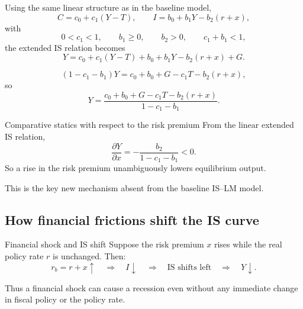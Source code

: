 Using the same linear structure as in the baseline model,
\[
C=c_0+c_1(Y-T),
\qquad
I=b_0+b_1Y-b_2(r+x),
\]
with
\[
0<c_1<1,\qquad b_1\ge 0,\qquad b_2>0,\qquad c_1+b_1<1,
\]
the extended IS relation becomes
\[
Y = c_0+c_1(Y-T)+b_0+b_1Y-b_2(r+x)+G.
\]

\begin{keyformula}[title={Key Formula: Linear extended IS relation}]
\[
(1-c_1-b_1)Y
=
c_0+b_0+G-c_1T-b_2(r+x),
\]
so
\[
Y
=
\frac{c_0+b_0+G-c_1T-b_2(r+x)}{1-c_1-b_1}.
\]
\end{keyformula}

\begin{theorem}{Comparative statics with respect to the risk premium}{}
From the linear extended IS relation,
\[
\frac{\partial Y}{\partial x}
=
-\frac{b_2}{1-c_1-b_1}
<0.
\]
So a rise in the risk premium unambiguously lowers equilibrium output.
\end{theorem}

\noindent
This is the key new mechanism absent from the baseline IS--LM model.

\subsection{How financial frictions shift the IS curve}

\begin{theorem}{Financial shock and IS shift}{}
Suppose the risk premium $x$ rises while the real policy rate $r$ is unchanged. Then:
\[
r_b = r+x \uparrow
\quad\Longrightarrow\quad
I \downarrow
\quad\Longrightarrow\quad
\text{IS shifts left}
\quad\Longrightarrow\quad
Y \downarrow.
\]
\end{theorem}

\noindent
Thus a financial shock can cause a recession even without any immediate change in fiscal policy or the policy rate.

\begin{center}
\end{center}

